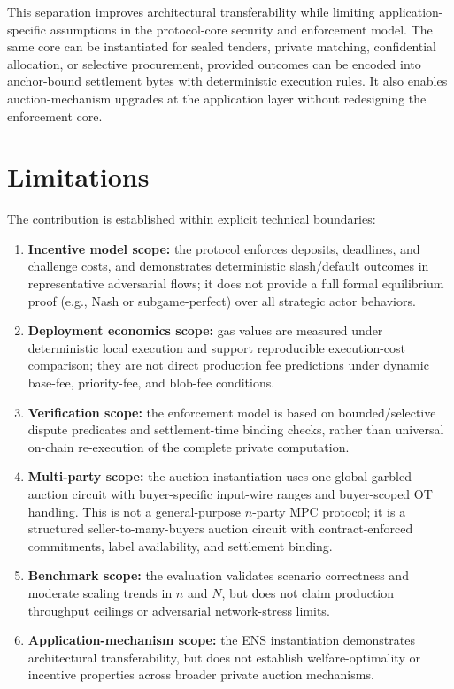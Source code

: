 \documentclass[final,twoside]{vutinfth}
\begin{document}
This separation improves architectural transferability while limiting
application-specific assumptions in the protocol-core security and enforcement
model.
The same core can be instantiated for sealed tenders, private matching,
confidential allocation, or selective procurement, provided outcomes can be
encoded into anchor-bound settlement bytes with deterministic execution rules.
It also enables auction-mechanism upgrades at the application layer without
redesigning the enforcement core.

\section{Limitations}
The contribution is established within explicit technical boundaries:
\begin{enumerate}
\item \textbf{Incentive model scope:} the protocol enforces deposits, deadlines,
and challenge costs, and demonstrates deterministic slash/default outcomes in
representative adversarial flows; it does not provide a full formal equilibrium
proof (e.g., Nash or subgame-perfect) over all strategic actor behaviors.
\item \textbf{Deployment economics scope:} gas values are measured under
deterministic local execution and support reproducible execution-cost
comparison; they are not direct production fee predictions under dynamic
base-fee, priority-fee, and blob-fee conditions.
\item \textbf{Verification scope:} the enforcement model is based on
bounded/selective dispute predicates and settlement-time binding checks, rather
than universal on-chain re-execution of the complete private computation.
\item \textbf{Multi-party scope:} the auction instantiation uses one global
garbled auction circuit with buyer-specific input-wire ranges and buyer-scoped
OT handling.
This is not a general-purpose \(n\)-party MPC protocol; it is a structured
seller-to-many-buyers auction circuit with contract-enforced commitments, label
availability, and settlement binding.
\item \textbf{Benchmark scope:} the evaluation validates scenario correctness and
moderate scaling trends in \(n\) and \(N\), but does not claim production
throughput ceilings or adversarial network-stress limits.
\item \textbf{Application-mechanism scope:} the ENS instantiation demonstrates
architectural transferability, but does not establish welfare-optimality or
incentive properties across broader private auction mechanisms.
\end{enumerate}
\end{document}
